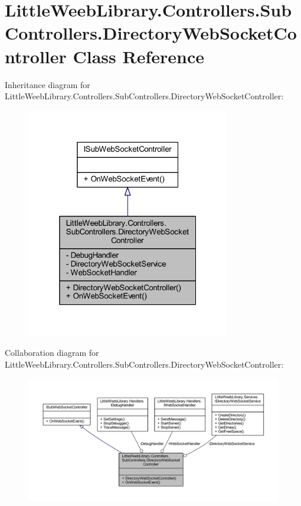 \hypertarget{class_little_weeb_library_1_1_controllers_1_1_sub_controllers_1_1_directory_web_socket_controller}{}\section{Little\+Weeb\+Library.\+Controllers.\+Sub\+Controllers.\+Directory\+Web\+Socket\+Controller Class Reference}
\label{class_little_weeb_library_1_1_controllers_1_1_sub_controllers_1_1_directory_web_socket_controller}


Inheritance diagram for Little\+Weeb\+Library.\+Controllers.\+Sub\+Controllers.\+Directory\+Web\+Socket\+Controller\+:\nopagebreak
\begin{figure}[H]
\begin{center}
\leavevmode
\includegraphics[width=253pt]{class_little_weeb_library_1_1_controllers_1_1_sub_controllers_1_1_directory_web_socket_controller__inherit__graph}
\end{center}
\end{figure}


Collaboration diagram for Little\+Weeb\+Library.\+Controllers.\+Sub\+Controllers.\+Directory\+Web\+Socket\+Controller\+:\nopagebreak
\begin{figure}[H]
\begin{center}
\leavevmode
\includegraphics[width=350pt]{class_little_weeb_library_1_1_controllers_1_1_sub_controllers_1_1_directory_web_socket_controller__coll__graph}
\end{center}
\end{figure}
